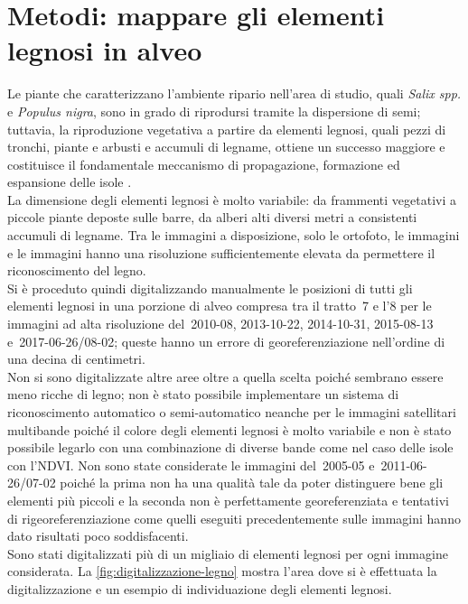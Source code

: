 \section{Metodi: mappare gli elementi legnosi in alveo}
Le piante che caratterizzano l'ambiente ripario nell'area di studio, quali \emph{Salix spp.} e \emph{Populus nigra}, sono in grado di riprodursi tramite la dispersione di semi;
tuttavia, la riproduzione vegetativa a partire da elementi legnosi, quali pezzi di tronchi, piante e arbusti e accumuli di legname, ottiene un successo maggiore e costituisce il fondamentale meccanismo di propagazione, formazione ed espansione delle isole .
\\
La dimensione degli elementi legnosi è molto variabile: da frammenti vegetativi a piccole piante deposte sulle barre, da alberi alti diversi metri a consistenti accumuli di legname.
Tra le immagini a disposizione, solo le ortofoto, le immagini \Pl{} e le immagini \WV{} hanno una risoluzione sufficientemente elevata da permettere il riconoscimento del legno.
\\
Si è proceduto quindi digitalizzando manualmente le posizioni di tutti gli elementi legnosi in una porzione di alveo compresa tra il tratto~7 e l'8 per le immagini ad alta risoluzione del~2010-08, 2013-10-22, 2014-10-31, 2015-08-13 e~2017-06-26/08-02; queste hanno un errore di georeferenziazione nell'ordine di una decina di centimetri.
\\
Non si sono digitalizzate altre aree oltre a quella scelta poiché sembrano essere meno ricche di legno; non è stato possibile implementare un sistema di riconoscimento automatico o semi-automatico neanche per le immagini satellitari multibande poiché il colore degli elementi legnosi è molto variabile e non è stato possibile legarlo con una combinazione di diverse bande come nel caso delle isole con l'NDVI.
Non sono state considerate le immagini del~2005-05 e~2011-06-26/07-02 poiché la prima non ha una qualità tale da poter distinguere bene gli elementi più piccoli e la seconda non è perfettamente georeferenziata e tentativi di rigeoreferenziazione come quelli eseguiti precedentemente sulle immagini \AST{} hanno dato risultati poco soddisfacenti.
\\
Sono stati digitalizzati più di un migliaio di elementi legnosi per ogni immagine considerata.
La \cref{fig:digitalizzazione-legno} mostra l'area dove si è effettuata la digitalizzazione e un esempio di individuazione degli elementi legnosi.
%
